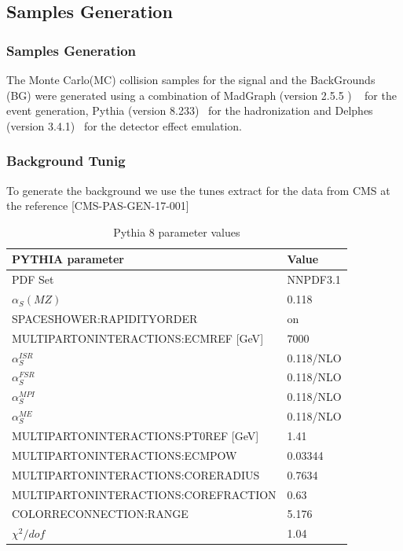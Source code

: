 \documentclass{beamer}
\begin{document}
\begin{frame}
\section{Samples Generation}
\frametitle{Samples Generation}
\begin{justify}
The Monte Carlo(MC) collision samples for the signal and the BackGrounds (BG) were generated using a combination of MadGraph (version 2.5.5 ) ~%
for the event generation, Pythia (version 8.233)~  %
for the hadronization and Delphes (version 3.4.1)~  %
for the detector effect emulation.
\end{justify}

\end{frame}

\begin{frame}
\frametitle{Background Tunig}
{\small To generate the background we use the tunes extract for the data from CMS at the reference [CMS-PAS-GEN-17-001] }

{\scriptsize
\begin{table}[]
\begin{tabular}{ll}
\hline
\textbf{PYTHIA parameter}                & \textbf{Value} \\\hline
PDF Set                                  & NNPDF3.1       \\
$\alpha_S(MZ)$                           & 0.118          \\
SPACESHOWER:RAPIDITYORDER                & on             \\
MULTIPARTONINTERACTIONS:ECMREF {[}GeV{]} & 7000           \\
$\alpha^{ISR}_S$                         & 0.118/NLO      \\
$\alpha^{FSR}_S$                         & 0.118/NLO      \\
$\alpha^{MPI}_S$                         & 0.118/NLO      \\
$\alpha^{ME}_S$                          & 0.118/NLO      \\
MULTIPARTONINTERACTIONS:PT0REF {[}GeV{]} & 1.41           \\
MULTIPARTONINTERACTIONS:ECMPOW           & 0.03344        \\
MULTIPARTONINTERACTIONS:CORERADIUS       & 0.7634         \\
MULTIPARTONINTERACTIONS:COREFRACTION     & 0.63           \\
COLORRECONNECTION:RANGE                  & 5.176          \\
$\chi^2/dof$                             & 1.04           \\\hline
\end{tabular}
\caption{Pythia 8 parameter values }
\label{PythiaTune}

\end{table}
}

\end{frame}
\end{document}
